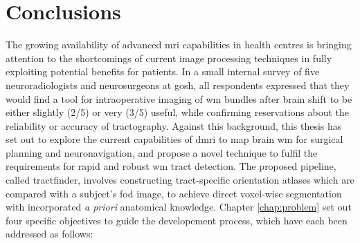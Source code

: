 \chapter{Conclusions}

The growing availability of advanced \gls{mri} capabilities in health centres is bringing attention to the shortcomings of current image processing techniques in fully exploiting potential benefits for patients.
In a small internal survey of five neuroradiologists and neurosurgeons at \gls{gosh}, all respondents expressed that they would find a tool for intraoperative imaging of \gls{wm} bundles after brain shift to be either slightly (2/5) or very (3/5) useful, while confirming reservations about the reliability or accuracy of tractography.
Against this background, this thesis has set out to explore the current capabilities of \gls{dmri} to map brain \gls{wm} for surgical planning and neuronavigation, and propose a novel technique to fulfil the requirements for rapid and robust \gls{wm} tract detection.
The proposed pipeline, called tractfinder, involves constructing tract-specific orientation atlases which are compared with a subject's \gls{fod} image, to achieve direct voxel-wise segmentation with incorporated \textit{a priori} anatomical knowledge.
Chapter \ref{chap:problem} set out four specific objectives to guide the developement process, which have each been addressed as follows:

